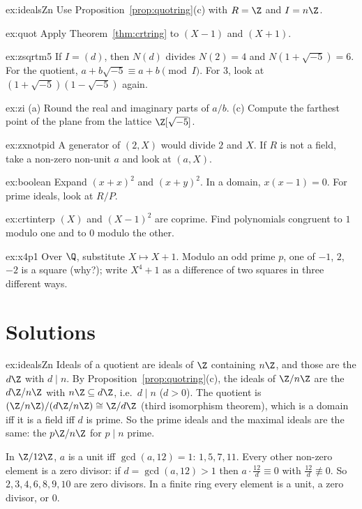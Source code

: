 \begin{hint}{ex:idealsZn}
Use Proposition~\ref{prop:quotring}(c) with $R=\Z$ and $I=n\Z$.
\end{hint}
\begin{hint}{ex:quot}
Apply Theorem~\ref{thm:crtring} to $(X-1)$ and $(X+1)$.
\end{hint}
\begin{hint}{ex:zsqrtm5}
If $I=(d)$, then $N(d)$ divides $N(2)=4$ and $N(1+\sqrt{-5})=6$. For the quotient, $a+b\sqrt{-5}\equiv a+b\pmod I$. For $3$, look at $(1+\sqrt{-5})(1-\sqrt{-5})$ again.
\end{hint}
\begin{hint}{ex:zi}
(a) Round the real and imaginary parts of $a/b$. (c) Compute the farthest point of the plane from the lattice $\Z[\sqrt{-5}]$.
\end{hint}
\begin{hint}{ex:zxnotpid}
A generator of $(2,X)$ would divide $2$ and $X$. If $R$ is not a field, take a non-zero non-unit $a$ and look at $(a,X)$.
\end{hint}
\begin{hint}{ex:boolean}
Expand $(x+x)^2$ and $(x+y)^2$. In a domain, $x(x-1)=0$. For prime ideals, look at $R/P$.
\end{hint}
\begin{hint}{ex:crtinterp}
$(X)$ and $(X-1)^2$ are coprime. Find polynomials congruent to $1$ modulo one and to $0$ modulo the other.
\end{hint}
\begin{hint}{ex:x4p1}
Over $\Q$, substitute $X\mapsto X+1$. Modulo an odd prime $p$, one of $-1$, $2$, $-2$ is a square (why?); write $X^4+1$ as a difference of two squares in three different ways.
\end{hint}

\section{Solutions}

\begin{solution}{ex:idealsZn}
\idea Ideals of a quotient are ideals of $\Z$ containing $n\Z$, and those are the $d\Z$ with $d\mid n$.
\writeup By Proposition~\ref{prop:quotring}(c), the ideals of $\Z/n\Z$ are the $d\Z/n\Z$ with $n\Z\subseteq d\Z$, i.e.\ $d\mid n$ ($d>0$). The quotient is $(\Z/n\Z)/(d\Z/n\Z)\cong\Z/d\Z$ (third isomorphism theorem), which is a domain iff it is a field iff $d$ is prime. So the prime ideals and the maximal ideals are the same: the $p\Z/n\Z$ for $p\mid n$ prime.

In $\Z/12\Z$, $a$ is a unit iff $\gcd(a,12)=1$: $1,5,7,11$. Every other non-zero element is a zero divisor: if $d=\gcd(a,12)>1$ then $a\cdot\frac{12}d\equiv0$ with $\frac{12}d\not\equiv0$. So $2,3,4,6,8,9,10$ are zero divisors. In a finite ring every element is a unit, a zero divisor, or $0$.
\end{solution}


